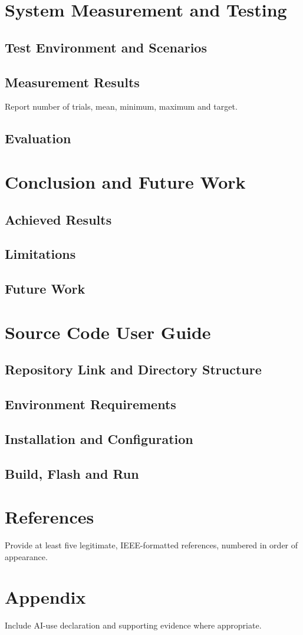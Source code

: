 \documentclass[12pt,a4paper]{report}
\begin{document}
\chapter{System Measurement and Testing}
\section{Test Environment and Scenarios}
\section{Measurement Results}
Report number of trials, mean, minimum, maximum and target.
\section{Evaluation}
\chapter{Conclusion and Future Work}
\section{Achieved Results}
\section{Limitations}
\section{Future Work}
\chapter{Source Code User Guide}
\section{Repository Link and Directory Structure}
\section{Environment Requirements}
\section{Installation and Configuration}
\section{Build, Flash and Run}
\chapter*{References}
Provide at least five legitimate, IEEE-formatted references, numbered in order of appearance.
\chapter*{Appendix}
Include AI-use declaration and supporting evidence where appropriate.
\end{document}
